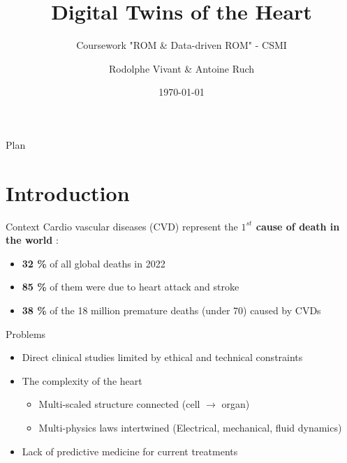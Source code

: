 \documentclass{beamer}
\title{Digital Twins of the Heart}
\subtitle{Coursework "ROM \& Data-driven ROM" - CSMI}
\author{Rodolphe Vivant \& Antoine Ruch}
\institute{UFR of Mathematics and Informatics}
\date{\today}
\begin{document}
\begin{frame}
  \titlepage
\end{frame}

\begin{frame}{Plan}
  \tableofcontents
\end{frame}

\section{Introduction}


\begin{frame}{Context \cite{who2025cvd}}
  Cardio vascular diseases (CVD) represent the \textbf{$1^{st}$ cause of death in the world} \cite{who2025cvd} :
  \begin{itemize}
    \item \textbf{32 \%} of all global deaths in 2022
    \item \textbf{85 \%} of them were due to heart attack and stroke
    \item \textbf{38 \%} of the 18 million premature deaths (under 70) caused by CVDs
  \end{itemize}
\end{frame}

\begin{frame}{Problems \cite{gerach2021electro}}
    \begin{itemize}
        \item Direct clinical studies limited by ethical and technical constraints
        \item The complexity of the heart 
        \begin{itemize}
            \item Multi-scaled structure connected (cell $\rightarrow$ organ)
            \item Multi-physics laws intertwined (Electrical, mechanical, fluid dynamics)
        \end{itemize}
        \item Lack of predictive medicine for current treatments 
    \end{itemize}
\end{frame}
\end{document}
